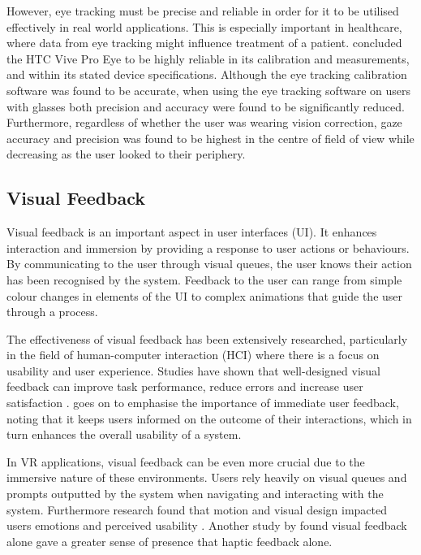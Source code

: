 \documentclass{l4proj}
\begin{document}
However, eye tracking must be precise and reliable in order for it to be utilised effectively in real world applications. This is especially important in healthcare, where data from eye tracking might influence treatment of a patient. \citet{SchuetzFiehler2022} concluded the HTC Vive Pro Eye to be highly reliable in its calibration and measurements, and within its stated device specifications. Although the eye tracking calibration software was found to be accurate, when using the eye tracking software on users with glasses both precision and accuracy were found to be significantly reduced. Furthermore, regardless of whether the user was wearing vision correction, gaze accuracy and precision was found to be highest in the centre of field of view while decreasing as the user looked to their periphery. 

\subsection{Visual Feedback}
Visual feedback is an important aspect in user interfaces (UI). It enhances interaction and immersion by providing a response to user actions or behaviours. By communicating to the user through visual queues, the user knows their action has been recognised by the system. Feedback to the user can range from simple colour changes in elements of the UI to complex animations that guide the user through a process.

The effectiveness of visual feedback has been extensively researched, particularly in the field of human-computer interaction (HCI) where there is a focus on usability and user experience. Studies have shown that well-designed visual feedback can improve task performance, reduce errors and increase user satisfaction \citep{HCIMotionDesign2023}. \citet{HCIMotionDesign2023} goes on to emphasise the importance of immediate user feedback, noting that it keeps users informed on the outcome of their interactions, which in turn enhances the overall usability of a system.

In VR applications, visual feedback can be even more crucial due to the immersive nature of these environments. Users rely heavily on visual queues and prompts outputted by the system when navigating and interacting with the system. Furthermore research found that motion and visual design impacted users emotions and perceived usability \citep{Hassenzahl2008}. Another study by \citet{Gibbs2022Visual} found visual feedback alone gave a greater sense of presence that haptic feedback alone.
\end{document}
